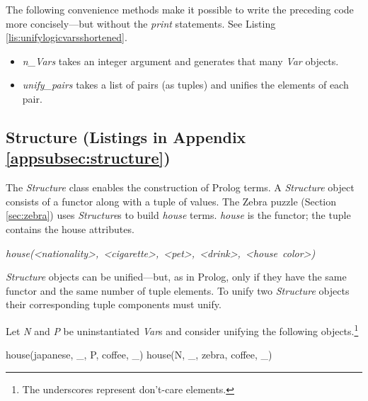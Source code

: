 The following convenience methods make it possible to write the preceding code more concisely---but without the \textit{print} statements. See Listing \ref{lis:unifylogicvarsshortened}.

\begin{itemize}
    \item \textit{n\_Vars} takes an integer argument and generates that many \textit{Var} objects.
    \item \textit{unify\_pairs} takes a list of pairs (as tuples) and unifies the elements of each pair.
\end{itemize}


\subsection{Structure (Listings in Appendix \ref{appsubsec:structure})} \label{subsec:structure}

The \textit{Structure} class enables the construction of Prolog terms. A \textit{Structure} object consists of a functor along with a tuple of values. The Zebra puzzle (Section \ref{sec:zebra}) uses \textit{Structure}s to build \textit{house} terms. \textit{house} is the functor; the tuple contains the house attributes. 

\centerline{\textit{house(\textless nationality\textgreater,~\textless cigarette\textgreater,~\textless pet\textgreater,~\textless drink\textgreater,~\textless house~color\textgreater)}}
\smallv

\textit{Structure} objects can be unified---but, as in Prolog, only if they have the same functor and the same number of tuple elements. To unify two \textit{Structure} objects their corresponding tuple components must unify. 
\smallv

Let \textit{N} and \textit{P} be uninstantiated \textit{Var}s and consider unifying the following objects.\footnote{The underscores represent don't-care elements.} 
\begin{python}
   house(japanese, _, P, coffee, _)
   house(N, _, zebra, coffee, _)
\end{python}

